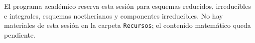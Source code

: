 \begin{nota}
El programa académico reserva esta sesión para esquemas reducidos, irreducibles e integrales, esquemas noetherianos y componentes irreducibles. No hay materiales de esta sesión en la carpeta \texttt{Recursos}; el contenido matemático queda pendiente.
\end{nota}
